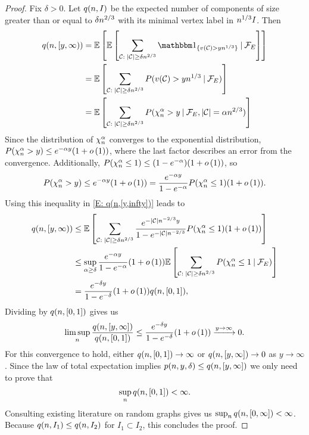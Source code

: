 \begin{proof}
	Fix $\delta > 0$.
	Let $q(n,I)$ be the expected number of components of size greater than or equal to $\delta n^{2 / 3}$ 
	with its minimal vertex label in $n^{1 / 3}I$.
	Then
	\begin{equation} \label{E: q(n,[y,infty])}
	\begin{aligned}
	\NComp{[y, \infty)}
	&= \ExpBig{ \ExpBig{ \sum_{\Ccal: \; |\Ccal| \geq \delta\n{2}{3}} \Ind{\{ v(\Ccal) > y\n{1}{3} \}} \cond \SigmaAlgebra_E } } \\
	&= \ExpBig{ \sum_{\Ccal: \; |\Ccal| \geq \delta\n{2}{3}} P( v(\Ccal) > y\n{1}{3} \cond \SigmaAlgebra_E) } \\
	&= \ExpBig{ \sum_{\Ccal: \; |\Ccal| \geq \delta\n{2}{3}} P(\ChiAn > y \cond \SigmaAlgebra_E, |\Ccal| = \alpha\n{2}{3}) }
	\end{aligned}
	\end{equation}
	Since the distribution of $\chi^\alpha_n$ converges to the exponential distribution,
	$P(\chi^\alpha_n > y) \leq e^{-\alpha y} (1+ o\left(1\right))$,
	where the last factor describes an error from the convergence.
	Additionally, $P(\chi^\alpha_n \leq 1) \leq (1 - e^{-\alpha}) (1+ o\left(1\right))$,
	so
	\begin{equation}
	P(\chi^\alpha_n > y) \leq e^{-\alpha y} (1+ o\left(1\right)) = \frac{e^{-\alpha y}}{1 - e^{-\alpha}} P(\chi^\alpha_n \leq 1) (1 + o\left(1\right)).
	\end{equation}
	Using this inequality in \eqref{E: q(n,[y,infty])} leads to
	\begin{equation}
	\begin{aligned}
	q(n,[y, \infty))
	&\leq \mathbb{E} \left[  \sum_{\mathcal{C}: \; |\mathcal{C}| \geq \delta n^{2 / 3}}
		\frac{e^{-|\mathcal{C}|n^{-2 / 3}y}}{1-e^{-|\mathcal{C}|n^{-2 / 3}}} P(\chi^\alpha_n \leq 1) (1 + o\left(1\right))  \right] \\
	&\leq \sup_{\alpha \geq \delta} \frac{e^{-\alpha y}}{1-e^{-\alpha}} (1 + o\left(1\right)) 
		\mathbb{E} \left[  \sum_{\mathcal{C}: \; |\mathcal{C}| \geq \delta n^{2 / 3}} P(\chi^\alpha_n \leq 1 \: | \: \mathcal{F}_E )  \right] \\
	&= \frac{e^{-\delta y}}{1-e^{-\delta}} (1 + o\left(1\right)) q(n,[0,1]),
	\end{aligned}
	\end{equation}
	Dividing by $q(n,[0,1])$ gives us
	\begin{equation}
	\limsup_n \frac{q(n,[y,\infty])}{q(n,[0,1])} \leq \frac{e^{-\delta y}}{1-e^{-\delta}} (1 + o\left(1\right)) \xrightarrow{y \rightarrow \infty} 0.
	\end{equation}
	For this convergence to hold,
	either $q(n,[0,1]) \rightarrow \infty$ or $q(n,[y,\infty]) \rightarrow 0$ as $y \rightarrow \infty$.
	Since the law of total expectation implies $p(n,y,\delta) \leq q(n,[y,\infty])$
	we only need to prove that
	\begin{equation}
	\sup_n q(n,[0,1]) < \infty.
	\end{equation}
	Consulting existing literature on random graphs gives us $\sup_n q(n,[0, \infty]) < \infty$.
	Because $q(n,I_1) \leq q(n,I_2)$ for $I_1 \subset I_2$,
	this concludes the proof.
	

\end{proof}
